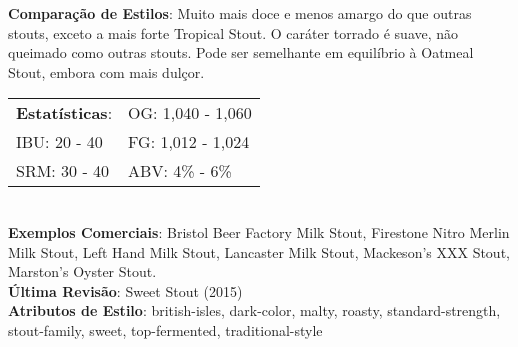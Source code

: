 \textbf{Comparação de Estilos}: Muito mais doce e menos amargo do que outras stouts, exceto a mais forte Tropical Stout. O caráter torrado é suave, não queimado como outras stouts. Pode ser semelhante em equilíbrio à Oatmeal Stout, embora com mais dulçor. \\
\begin{tabular}{@{}p{35mm}p{35mm}@{}}
  \textbf{Estatísticas}: & OG: 1,040 - 1,060 \\
  IBU: 20 - 40  & FG: 1,012 - 1,024 \\
  SRM: 30 - 40  & ABV: 4\% - 6\%
\end{tabular}\\
\textbf{Exemplos Comerciais}: Bristol Beer Factory Milk Stout, Firestone Nitro Merlin Milk Stout, Left Hand Milk Stout, Lancaster Milk Stout, Mackeson's XXX Stout, Marston’s Oyster Stout. \\
\textbf{Última Revisão}: Sweet Stout (2015) \\
\textbf{Atributos de Estilo}: british-isles, dark-color, malty, roasty, standard-strength, stout-family, sweet, top-fermented, traditional-style

